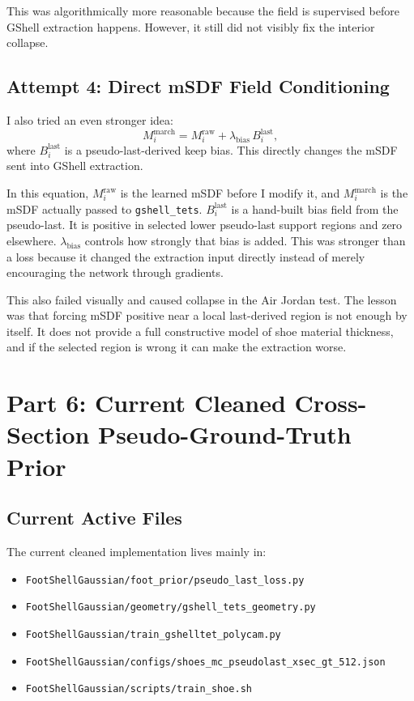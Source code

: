 \documentclass[11pt]{article}
\begin{document}
This was algorithmically more reasonable because the field is supervised before
GShell extraction happens.  However, it still did not visibly fix the interior
collapse.

\subsection{Attempt 4: Direct mSDF Field Conditioning}

I also tried an even stronger idea:
\[
M_i^{\text{march}}
=
M_i^{\text{raw}}
+\lambda_{\text{bias}}\,B_i^{\text{last}},
\]
where \(B_i^{\text{last}}\) is a pseudo-last-derived keep bias.  This directly
changes the mSDF sent into GShell extraction.

In this equation, \(M_i^{\text{raw}}\) is the learned mSDF before I modify it,
and \(M_i^{\text{march}}\) is the mSDF actually passed to
\texttt{gshell\_tets}.  \(B_i^{\text{last}}\) is a hand-built bias field from
the pseudo-last.  It is positive in selected lower pseudo-last support regions
and zero elsewhere.  \(\lambda_{\text{bias}}\) controls how strongly that bias
is added.  This was stronger than a loss because it changed the extraction
input directly instead of merely encouraging the network through gradients.

This also failed visually and caused collapse in the Air Jordan test.  The
lesson was that forcing mSDF positive near a local last-derived region is not
enough by itself.  It does not provide a full constructive model of shoe
material thickness, and if the selected region is wrong it can make the
extraction worse.

\section{Part 6: Current Cleaned Cross-Section Pseudo-Ground-Truth Prior}

\subsection{Current Active Files}

The current cleaned implementation lives mainly in:
\begin{itemize}
    \item \texttt{FootShellGaussian/foot\_prior/pseudo\_last\_loss.py}
    \item \texttt{FootShellGaussian/geometry/gshell\_tets\_geometry.py}
    \item \texttt{FootShellGaussian/train\_gshelltet\_polycam.py}
    \item \texttt{FootShellGaussian/configs/shoes\_mc\_pseudolast\_xsec\_gt\_512.json}
    \item \texttt{FootShellGaussian/scripts/train\_shoe.sh}
\end{itemize}
\end{document}

